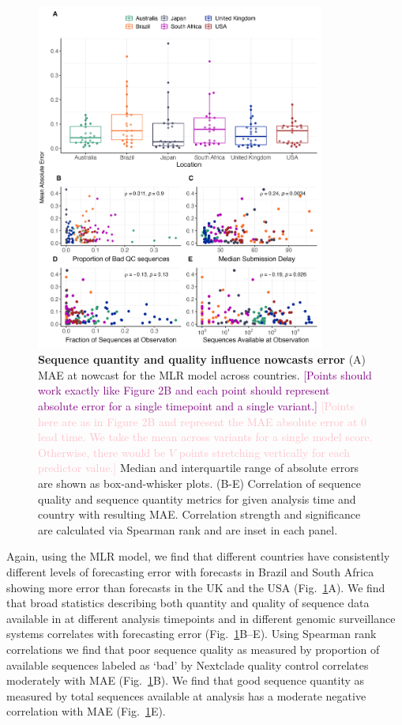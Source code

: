 \documentclass[11pt,oneside,letterpaper]{article}
\def\tbc#1{\textcolor{purple}{[#1]}}
\def\mfc#1{\textcolor{pink}{[#1]}}
\begin{document}
\begin{figure}[tb!]
	\centering
    \includegraphics[width=0.85\textwidth]{figures/Var_of_interest.png}
	\caption{
		\textbf{Sequence quantity and quality influence nowcasts error}
    (A) MAE at nowcast for the MLR model across countries.
    \tbc{Points should work exactly like Figure 2B and each point should represent absolute error for a single timepoint and a single variant.}
    \mfc{Points here are as in Figure 2B and represent the MAE absolute error at 0 lead time. We take the mean across variants for a single model score. Otherwise, there would be $V$ points stretching vertically for each predictor value.}
		Median and interquartile range of absolute errors are shown as box-and-whisker plots.
		(B-E) Correlation of sequence quality and sequence quantity metrics for given analysis time and country with resulting MAE.
    Correlation strength and significance are calculated via Spearman rank and are inset in each panel.
	}
	\label{fig:vars_of_interest}
\end{figure}

Again, using the MLR model, we find that different countries have consistently different levels of forecasting error with forecasts in Brazil and South Africa showing more error than forecasts in the UK and the USA  (Fig.~\ref{fig:vars_of_interest}A).
We find that broad statistics describing both quantity and quality of sequence data available in at different analysis timepoints and in different genomic surveillance systems correlates with forecasting error (Fig.~\ref{fig:vars_of_interest}B--E).
Using Spearman rank correlations we find that poor sequence quality as measured by proportion of available sequences labeled as `bad' by Nextclade quality control \cite{aksamentov2021nextclade} correlates moderately with MAE (Fig.~\ref{fig:vars_of_interest}B).
We find that good sequence quantity as measured by total sequences available at analysis has a moderate negative correlation with MAE (Fig.~\ref{fig:vars_of_interest}E).
\end{document}
